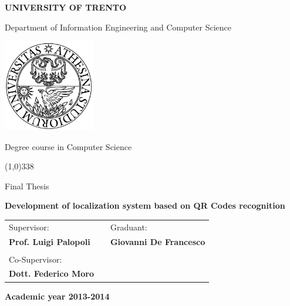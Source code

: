 \begin{titlepage}
  \pagestyle{empty}

  \begin{center}
    {\bfseries\Large {\huge U}NIVERSITY OF {\huge T}RENTO}

    \vspace{0.2cm}

    {\large Department of Information Engineering and Computer Science}

    \vspace{0.5cm}

    \begin{center}
      \includegraphics[width=0.3\textwidth]{img/logo_unitn.png}
    \end{center}

    \vspace{0.5cm}

    {\Large Degree course in Computer Science}

    \vspace{0.2cm}
    \line(1,0){338}
    \vspace{0.5cm}

    {\Large Final Thesis}

    \vspace{2.0cm}

    {\Large \bfseries {Development of localization system based on QR Codes recognition}}

    \vspace{0.3cm}
    

    \large
    \begin{center}
      \begin{tabular}{lcl}
        Supervisor: & \hspace{5cm} &  Graduant: \\
        {\bfseries Prof. Luigi Palopoli} & \hspace{5cm} & {\bfseries Giovanni De Francesco } \\ \\
        Co-Supervisor: \\ {\bfseries Dott. Federico Moro}
      \end{tabular}
    \end{center}
    \vspace{2.0cm}

    {\large \bfseries Academic year 2013-2014}
    \vfill

  \end{center}

\end{titlepage}
